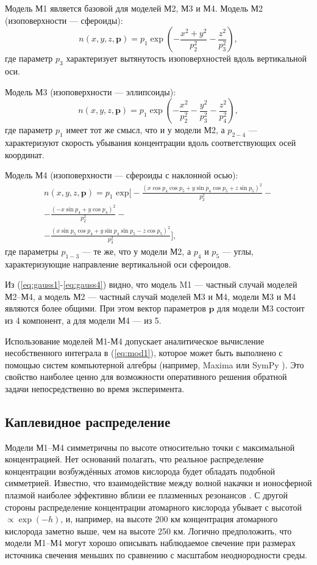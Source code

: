 \documentclass[12pt,a4paper]{article}
\renewcommand{\vec}{\mathbf}
\begin{document}
Модель М1 является базовой для моделей М2, М3 и М4. Модель М2 (изоповерхности --- сфероиды):
\begin{equation}\label{eq:gauss2}
	n(x,y,z,\vec{p})=p_1 \exp{(-\frac{x^2+y^2}{p_2^2}-\frac{z^2}{p_3^2})},
\end{equation}
где параметр $p_3$ характеризует вытянутость изоповерхностей вдоль вертикальной оси.

Модель М3 (изоповерхности --- эллипсоиды):
\begin{equation}\label{eq:gauss3}
n(x,y,z,\vec{p})=p_1 \exp{(-\frac{x^2}{p_2^2}-\frac{y^2}{p_3^2}-\frac{z^2}{p_4^2})},
\end{equation}
где параметр $p_{1}$ имеет тот же смысл, что и у модели М2, а $p_{2-4}$ --- 
характеризуют скорость убывания концентрации вдоль соответствующих осей координат.

Модель М4 (изоповерхности --- сфероиды с наклонной осью):
\begin{equation}\label{eq:gauss4}
\begin{split}
n(x,y,z,\vec{p})=p_1 \text{ exp} \bigg[ 
-\frac{(x\cos{p_4}\cos{p_5} + y\sin{p_4}\cos{p_5} + z\sin{p_5})^2}{p_2^2}-\\
-\frac{(-x\sin{p_4} + y\cos{p_4})^2}{p_2^2} -\\ 
-\frac{(x\sin{p_5}\cos{p_4} + y\sin{p_4}\sin{p_5} - z\cos{p_5})^2}{p_3^2}\bigg],
\end{split}
\end{equation}
где параметры $p_{1-3}$ --- те же, что у модели М2, а $p_4$ и $p_5$ --- углы, характеризующие направление вертикальной оси сфероидов.

Из (\ref{eq:gauss1}-\ref{eq:gauss4}) видно, что модель M1 --- частный случай моделей М2--М4, а модель М2 --- частный случай моделей М3 и М4, модели М3 и М4 являются более общими. При этом вектор параметров $\vec{p}$ для модели М3 состоит из 4 компонент, а для модели М4 --- из 5.

Использование моделей М1-М4 допускает аналитическое вычисление несобственного интеграла в (\ref{eq:mod1}), которое может быть выполнено с помощью систем компьютерной алгебры (например, Maxima \cite{Maxima} или SymPy \cite{SymPy}). Это свойство наиболее ценно для возможности оперативного решения обратной задачи непосредственно во время эксперимента. 

\subsection{Каплевидное распределение} \label{subsec:model2}
Модели М1--М4 симметричны по высоте относительно точки с максимальной концентрацией. Нет оснований полагать, что реальное распределение концентрации возбуждённых атомов кислорода будет обладать подобной симметрией. Известно, что взаимодействие между волной накачки и ионосферной плазмой наиболее эффективно вблизи ее плазменных резонансов \cite{Trach1979}. С другой стороны распределение концентрации атомарного кислорода убывает с высотой $\propto \exp {(-h)}$, и, например, на высоте 200 км концентрация атомарного кислорода заметно выше, чем на высоте 250 км. Логично предположить, что модели М1--М4 могут хорошо описывать наблюдаемое свечение при размерах источника свечения меньших по сравнению с масштабом неоднородности среды. 
\end{document}
